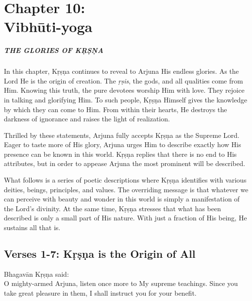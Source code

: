 \chapter{Chapter 10: \\Vibhūti-yoga}\label{chap-vibhuti-yoga}

\paragraph*{\MakeUppercase{The Glories of Kṛṣṇa}}

\noindent In this chapter, Kṛṣṇa continues to reveal to Arjuna His endless glories. As the Lord He is the origin of creation. The \textit{ṛṣis}, the gods, and all qualities come from Him. Knowing this truth, the pure devotees worship Him with love. They rejoice in talking and glorifying Him. To such people, Kṛṣṇa Himself gives the knowledge by which they can come to Him. From within their hearts, He destroys the darkness of ignorance and raises the light of realization.

Thrilled by these statements, Arjuna fully accepts Kṛṣṇa as the Supreme Lord. Eager to taste more of His glory, Arjuna urges Him to describe exactly how His presence can be known in this world. Kṛṣṇa replies that there is no end to His attributes, but in order to appease Arjuna the most prominent will be described.

What follows is a series of poetic descriptions where Kṛṣṇa identifies with various deities, beings, principles, and values. The overriding message is that whatever we can perceive with beauty and wonder in this world is simply a manifestation of the Lord’s divinity. At the same time, Kṛṣṇa stresses that what has been described is only a small part of His nature. With just a fraction of His being, He sustains all that is.

\section{Verses 1-7: Kṛṣṇa is the Origin of All}\label{sec-verses-1-7-krsna-is-the-origin-of-all}

{\hspace*{1em}Bhagavān Kṛṣṇa said: \\
O mighty-armed Arjuna, listen once more to My supreme teachings. Since you take great pleasure in them, I shall instruct you for your benefit.}


